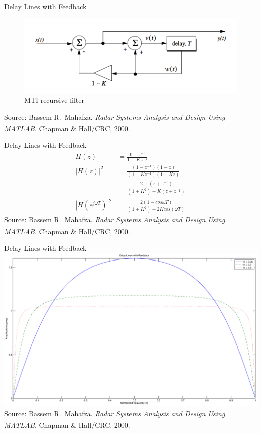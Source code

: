 \documentclass[mathserif]{beamer}
\begin{document}
    
    
    \begin{frame}{Delay Lines with Feedback}
	\begin{figure}[h]
		\centering
		\includegraphics[width=\linewidth]{feedbackDLC} 
		\caption{MTI recursive filter}
	\end{figure}
    	\tiny{Source: Bassem R.~Mahafza. \emph{Radar Systems Analysis and Design Using MATLAB\textsuperscript{\textregistered}}. Chapman \& Hall/CRC, 2000.}
    \end{frame}
    
    
    
    \begin{frame}{Delay Lines with Feedback}
      \begin{align}
      H(z) & = \frac{1 - z^{-1}}{1-Kz^{-1}} \nonumber \\
      |H(z)|^2 & = \frac{(1-z^{-1})(1-z)}{(1-Kz^{-1})(1-Kz)} \nonumber \\
      & = \frac{2-(z+z^{-1})}{(1+K^2)-K(z+z^{-1})} \nonumber \\
      \left|{H(e^{j\omega T})}\right|^2 & = \frac{2(1-cos\omega T)}{(1+K^2)-2Kcos(\omega T)} \nonumber
      \end{align}
      \vfill
      \vfill
    	\tiny{Source: Bassem R.~Mahafza. \emph{Radar Systems Analysis and Design Using MATLAB\textsuperscript{\textregistered}}. Chapman \& Hall/CRC, 2000.}

    \end{frame}
    
    
    \begin{frame}{Delay Lines with Feedback}
      \includegraphics[width=\linewidth]{dlFeedback} \\
      \vfill
      \vfill
      \tiny{Source: Bassem R.~Mahafza. \emph{Radar Systems Analysis and Design Using MATLAB\textsuperscript{\textregistered}}. Chapman \& Hall/CRC, 2000.}
    \end{frame}
   
\end{document}
